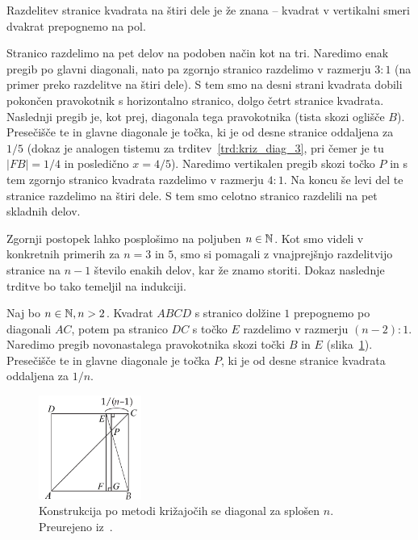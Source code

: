 Razdelitev stranice kvadrata na štiri dele je že znana -- kvadrat v vertikalni smeri dvakrat prepognemo na pol.

Stranico razdelimo na pet delov na podoben način kot na tri. Naredimo enak pregib po glavni diagonali, nato pa zgornjo stranico razdelimo v razmerju $3:1$ (na primer preko razdelitve na štiri dele). S tem smo na desni strani kvadrata dobili pokončen pravokotnik s horizontalno stranico, dolgo četrt stranice kvadrata. Naslednji pregib je, kot prej, diagonala tega pravokotnika (tista skozi oglišče $B$). Presečišče te in glavne diagonale je točka, ki je od desne stranice oddaljena za $1/5$ (dokaz je analogen tistemu za trditev~\ref{trd:kriz_diag_3}, pri čemer je tu $|FB| = 1/4$ in posledično $x = 4/5$). Naredimo vertikalen pregib skozi točko $P$ in s tem zgornjo stranico kvadrata razdelimo v razmerju $4:1$. Na koncu še levi del te stranice razdelimo na štiri dele. S tem smo celotno stranico razdelili na pet skladnih delov.

Zgornji postopek lahko posplošimo na poljuben $n \in \mathbb N$. Kot smo videli v konkretnih primerih za $n = 3$ in $5$, smo si pomagali z vnajprejšnjo razdelitvijo stranice na $n-1$ število enakih delov, kar že znamo storiti. Dokaz naslednje trditve bo tako temeljil na indukciji.

\begin{trditev}
    Naj bo $n \in \mathbb N, n > 2$. Kvadrat $ABCD$ s stranico dolžine $1$ prepognemo po diagonali $AC$, potem pa stranico $DC$ s točko $E$ razdelimo v razmerju $(n-2):1$. Naredimo pregib novonastalega pravokotnika skozi točki $B$ in $E$ (slika~\ref{fig:razdelitev_stranice_n1}). Presečišče te in glavne diagonale je točka $P$, ki je od desne stranice kvadrata oddaljena za $1/n$.
\end{trditev}
\begin{figure}[h]
    \centering
    \includegraphics[width=0.3\textwidth]{images/razdelitev_stranice_n1.png}
    \caption[Metoda križajočih diagonal]{Konstrukcija po metodi križajočih se diagonal za splošen $n$. Preurejeno iz~\cite[str. 38]{hull2013}.}
    \label{fig:razdelitev_stranice_n1}
\end{figure}

